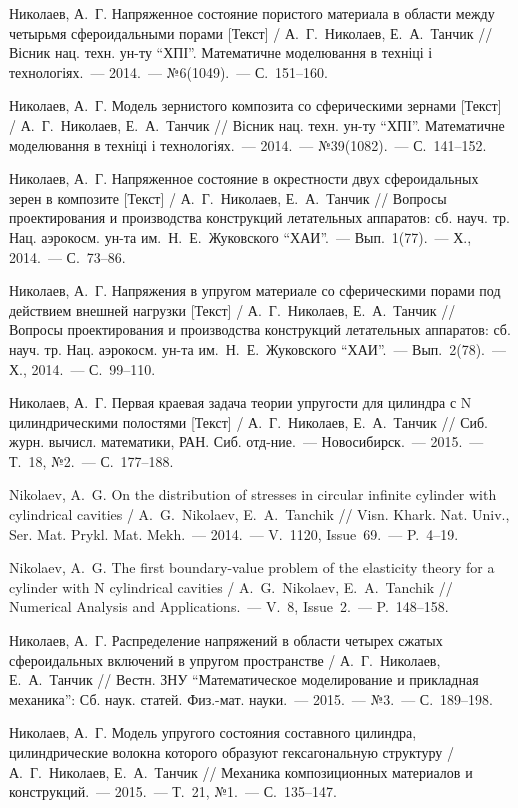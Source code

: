 \documentclass[book,14pt,small,oneside]{ncc}
\begin{document}
\begin{biblist}{99}
Николаев, А.~Г. 
Напряженное состояние пористого материала в области между четырьмя сфероидальными порами [Текст] 
/ А.~Г.~Николаев, Е.~А.~Танчик 
// Вісник нац. техн. ун-ту ``ХПІ''. Математичне моделювання в техніці і технологіях.~--- 2014.~--- №6(1049).~--- С.~151--160.

Николаев, А.~Г. 
Модель зернистого композита со сферическими зернами [Текст] 
/ А.~Г.~Николаев, Е.~А.~Танчик 
// Вісник нац. техн. ун-ту ``ХПІ''. Математичне моделювання в техніці і технологіях.~--- 2014.~--- №39(1082).~--- С.~141--152.

Николаев, А.~Г. 
Напряженное состояние в окрестности двух сфероидальных зерен в композите [Текст] 
/ А.~Г.~Николаев, Е.~А.~Танчик 
// Вопросы проектирования и производства конструкций летательных аппаратов: сб. науч. тр. Нац. аэрокосм. ун-та им.~Н.~Е.~Жуковского ``ХАИ''.~--- Вып.~1(77).~--- Х., 2014.~--- С.~73--86.

Николаев, А.~Г. 
Напряжения в упругом материале со сферическими порами под действием внешней нагрузки [Текст] 
/ А.~Г.~Николаев, Е.~А.~Танчик 
// Вопросы проектирования и производства конструкций летательных аппаратов: сб. науч. тр. Нац. аэрокосм. ун-та им.~Н.~Е.~Жуковского ``ХАИ''.~--- Вып.~2(78).~--- Х., 2014.~--- С.~99--110.

Николаев, А.~Г. 
Первая краевая задача теории упругости для цилиндра с N цилиндрическими полостями [Текст] 
/ А.~Г.~Николаев, Е.~А.~Танчик 
// Сиб. журн. вычисл. математики, РАН. Сиб. отд-ние.~--- Новосибирск.~--- 2015.~--- Т.~18, №2.~--- С.~177--188.

Nikolaev, A.~G. 
On the distribution of stresses in circular infinite cylinder with cylindrical cavities 
/ A.~G.~Nikolaev, E.~A.~Tanchik 
// Visn. Khark. Nat. Univ., Ser. Mat. Prykl. Mat. Mekh.~--- 2014.~--- V.~1120, Issue~69.~--- P.~4--19.

Nikolaev, A.~G.
The first boundary-value problem of the elasticity theory for a cylinder with N cylindrical cavities
/ A.~G.~Nikolaev, E.~A.~Tanchik
// Numerical Analysis and Applications.~--- V.~8, Issue~2.~--- P.~148--158.

Николаев, А.~Г.
Распределение напряжений в области четырех сжатых сфероидальных включений в упругом пространстве
/ А.~Г.~Николаев, Е.~А.~Танчик
// Вестн. ЗНУ ``Математическое моделирование и прикладная механика'': Сб. наук. статей. Физ.-мат. науки.~--- 2015.~--- №3.~--- С.~189--198.

Николаев, А.~Г.
Модель упругого состояния составного цилиндра, цилиндрические волокна которого образуют гексагональную структуру
/ А.~Г.~Николаев, Е.~А.~Танчик
// Механика композиционных материалов и конструкций.~--- 2015.~--- Т.~21, №1.~--- С.~135--147.

\end{biblist}
\end{document}
